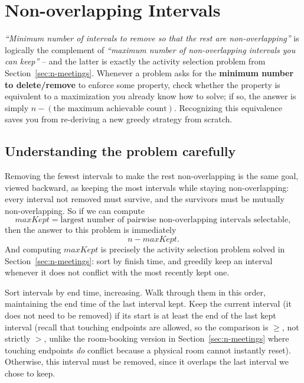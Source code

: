 \section{Non-overlapping Intervals}
\label{sec:non-overlapping-intervals}


\begin{patternbox}
\emph{``Minimum number of intervals to remove so that the rest are
non-overlapping''} is logically the complement of
\emph{``maximum number of non-overlapping intervals you can keep''} -- and
the latter is exactly the activity selection problem from
Section~\ref{sec:n-meetings}. Whenever a problem asks for the
\textbf{minimum number to delete/remove} to enforce some property, check
whether the property is equivalent to a maximization you already know how
to solve; if so, the answer is simply
$n - (\text{the maximum achievable count})$. Recognizing this equivalence
saves you from re-deriving a new greedy strategy from scratch.
\end{patternbox}

\subsection*{Understanding the problem carefully}

Removing the fewest intervals to make the rest non-overlapping is the same
goal, viewed backward, as keeping the most intervals while staying
non-overlapping: every interval not removed must survive, and the survivors
must be mutually non-overlapping. So if we can compute
\[
  \textit{maxKept} = \text{largest number of pairwise non-overlapping
  intervals selectable},
\]
then the answer to this problem is immediately
\[
  n - \textit{maxKept}.
\]
And computing $\textit{maxKept}$ is precisely the activity selection problem
solved in Section~\ref{sec:n-meetings}: sort by finish time, and greedily
keep an interval whenever it does not conflict with the most recently kept
one.

\begin{ideabox}
Sort intervals by end time, increasing. Walk through them in this order,
maintaining the end time of the last interval kept. Keep the current
interval (it does not need to be removed) if its start is at least the end
of the last kept interval (recall that touching endpoints are allowed, so
the comparison is $\ge$, not strictly $>$, unlike the room-booking version
in Section~\ref{sec:n-meetings} where touching endpoints \emph{do} conflict
because a physical room cannot instantly reset). Otherwise, this interval
must be removed, since it overlaps the last interval we chose to keep.
\end{ideabox}

